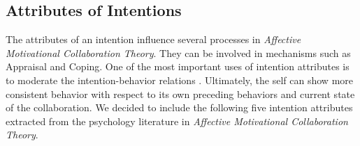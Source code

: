 \documentclass[12pt]{report}
\begin{document}
\subsection{Attributes of Intentions}
\label{section-intention-attributes}

The attributes of an intention influence several processes in \textit{Affective
Motivational Collaboration Theory}. They can be involved in mechanisms such as
Appraisal and Coping. One of the most important uses of intention attributes is
to moderate the intention-behavior relations
\cite{cooke:intention-behavior-consistency}. Ultimately, the self can show more
consistent behavior with respect to its own preceding behaviors and current
state of the collaboration. We decided to include the following five intention
attributes extracted from the psychology literature in \textit{Affective
Motivational Collaboration Theory}.
\end{document}
